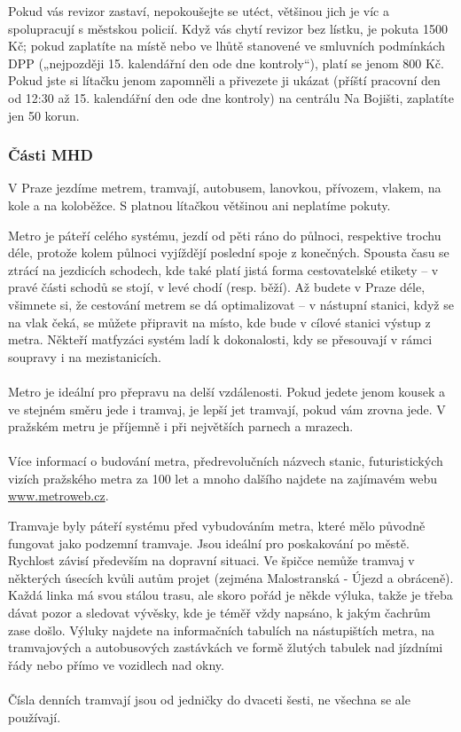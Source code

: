 Pokud vás revizor zastaví, nepokoušejte se utéct, většinou jich je víc a
spolupracují s městskou policií. Když vás chytí revizor bez lístku, je pokuta
1500 Kč; pokud zaplatíte na místě nebo ve lhůtě stanovené ve smluvních
podmínkách DPP („nejpozději 15. kalendářní den ode dne kontroly“), platí se
jenom 800 Kč. Pokud jste si lítačku jenom zapomněli a přivezete ji ukázat
(příští pracovní den od 12:30 až 15. kalendářní den ode dne kontroly) na
centrálu Na Bojišti, zaplatíte jen 50 korun.


\subsubsection{Části MHD}
V Praze jezdíme metrem, tramvají, autobusem, lanovkou, přívozem, vlakem, na kole
a na koloběžce. S platnou lítačkou většinou ani neplatíme pokuty.

Metro je páteří celého systému, jezdí od pěti ráno do půlnoci, respektive trochu
déle, protože kolem půlnoci vyjíždějí poslední spoje z konečných. Spousta času
se ztrácí na jezdicích schodech, kde také platí jistá forma cestovatelské
etikety – v pravé části schodů se stojí, v levé chodí (resp. běží). Až budete v
Praze déle, všimnete si, že cestování metrem se dá optimalizovat – v nástupní
stanici, když se na vlak čeká, se můžete připravit na místo, kde bude v cílové
stanici výstup z metra. Někteří matfyzáci systém ladí k dokonalosti, kdy se
přesouvají v rámci soupravy i na mezistanicích.
\\\\
Metro je ideální pro přepravu na delší vzdálenosti. Pokud jedete jenom kousek a
ve stejném směru jede i tramvaj, je lepší jet tramvají, pokud vám zrovna jede. V
pražském metru je příjemně i při největších parnech a mrazech.
\\\\
Více informací o budování metra, předrevolučních názvech stanic, futuristických
vizích pražského metra za 100 let a mnoho dalšího najdete na zajímavém webu
\url{www.metroweb.cz}.

Tramvaje byly páteří systému před vybudováním metra, které mělo původně fungovat
jako podzemní tramvaje. Jsou ideální pro poskakování po městě. Rychlost závisí
především na dopravní situaci. Ve špičce nemůže tramvaj v některých úsecích
kvůli autům projet (zejména Malostranská - Újezd a obráceně). Každá linka má
svou stálou trasu, ale skoro pořád je někde výluka, takže je třeba dávat pozor a
sledovat vývěsky, kde je téměř vždy napsáno, k jakým čachrům zase došlo. Výluky
najdete na informačních tabulích na nástupištích metra, na tramvajových a
autobusových zastávkách ve formě žlutých tabulek nad jízdními řády nebo přímo ve
vozidlech nad okny.
\\\\
Čísla denních tramvají jsou od jedničky do dvaceti šesti, ne všechna se ale
používají.

